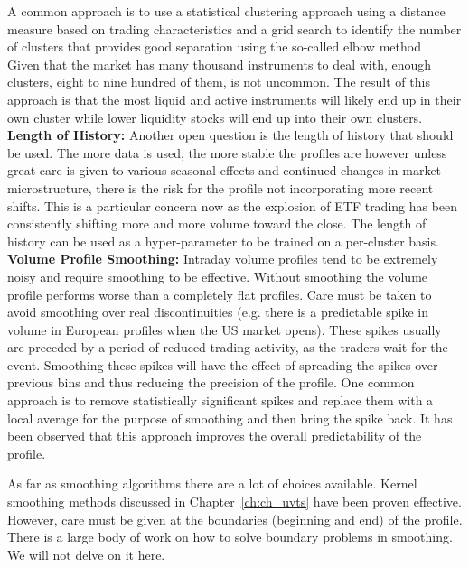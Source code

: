 A common approach is to use a statistical clustering approach using a distance measure based on trading characteristics and a grid search to identify the number of clusters that provides good separation using the so-called elbow method . Given that the market has many thousand instruments to deal with, enough clusters, eight to nine hundred of them, is not uncommon. The result of this approach is that the most liquid and active instruments will likely end up in their own cluster while lower liquidity stocks will end up into their own clusters. \\

\noindent\textbf{Length of History:} Another open question is the length of history that should be used. The more data is used, the more stable the profiles are however unless great care is given to various seasonal effects and continued changes in market microstructure, there is the risk for the profile not incorporating more recent shifts. This is a particular concern now as the explosion of ETF trading has been consistently shifting more and more volume toward the close. The length of history can be used as a hyper-parameter to be trained on a per-cluster basis. \\


\noindent\textbf{Volume Profile Smoothing:} Intraday volume profiles tend to be extremely noisy and require smoothing to be effective. Without smoothing the volume profile performs worse than a completely flat profiles. Care must be taken to avoid smoothing over real discontinuities (e.g. there is a predictable spike in volume in European profiles when the US market opens). These spikes usually are preceded by a period of reduced trading activity, as the traders wait for the event. Smoothing these spikes will have the effect of spreading the spikes over previous bins and thus reducing the precision of the profile. One common approach is to remove statistically significant spikes and replace them with a local average for the purpose of smoothing and then bring the spike back. It has been observed that this approach improves the overall predictability of the profile. 


As far as smoothing algorithms there are a lot of choices available. Kernel smoothing methods discussed in Chapter~\ref{ch:ch_uvts} have been proven effective. However, care must be given at the boundaries (beginning and end) of the profile. There is a large body of work on how to solve boundary problems in smoothing. We will not delve on it here. \\

